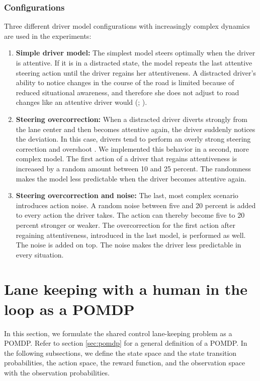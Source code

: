\subsubsection{Configurations}
\label{sec:driver_model_config}

Three different driver model configurations with increasingly complex dynamics are used in the experiments:
\begin{enumerate}
    \item \textbf{Simple driver model:} The simplest model steers optimally when the driver is attentive. If it is in a distracted state, the model repeats the last attentive steering action until the driver regains her attentiveness. A distracted driver's ability to notice changes in the course of the road is limited because of reduced situational awareness, and therefore she does not adjust to road changes like an attentive driver would (\cite{driver-awareness}; \cite{driver-awareness2}).
    \item \textbf{Steering overcorrection:} When a distracted driver diverts strongly from the lane center and then becomes attentive again, the driver suddenly notices the deviation. In this case, drivers tend to perform an overly strong steering correction and overshoot \parencite{oversteering-motivation}. We implemented this behavior in a second, more complex model. The first action of a driver that regains attentiveness is increased by a random amount between 10 and 25 percent. The randomness makes the model less predictable when the driver becomes attentive again.
    \item \textbf{Steering overcorrection and noise:} The last, most complex scenario introduces action noise. A random noise between five and 20 percent is added to every action the driver takes. The action can thereby become five to 20 percent stronger or weaker. The overcorrection for the first action after regaining attentiveness, introduced in the last model, is performed as well. The noise is added on top. The noise makes the driver less predictable in every situation.
\end{enumerate}


\section{Lane keeping with a human in the loop as a POMDP}
\label{sec:lane_keeping_loop}

In this section, we formulate the shared control lane-keeping problem as a POMDP. Refer to section \ref{sec:pomdp} for a general definition of a POMDP. In the following subsections, we define the state space and the state transition probabilities, the action space, the reward function, and the observation space with the observation probabilities. 

